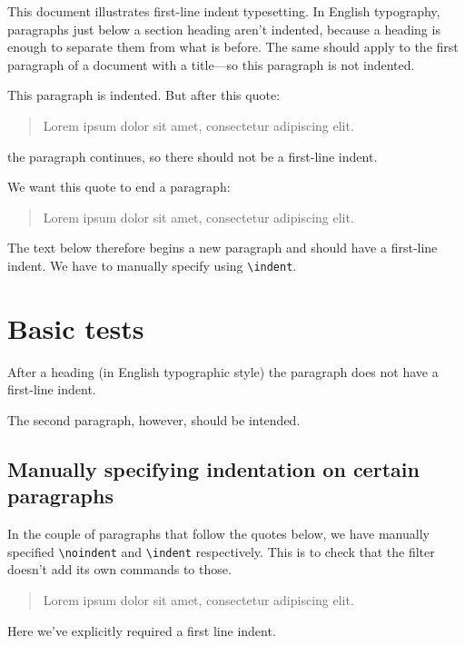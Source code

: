 \noindent This document illustrates first-line indent typesetting. In
English typography, paragraphs just below a section heading aren't
indented, because a heading is enough to separate them from what is
before. The same should apply to the first paragraph of a document with
a title---so this paragraph is not indented.

This paragraph is indented. But after this quote:

\begin{quote}
\noindent Lorem ipsum dolor sit amet, consectetur adipiscing elit.
\end{quote}

\noindent the paragraph continues, so there should not be a first-line
indent.

We want this quote to end a paragraph:

\begin{quote}
\noindent Lorem ipsum dolor sit amet, consectetur adipiscing elit.
\end{quote}

\indent The text below therefore begins a new paragraph and should have
a first-line indent. We have to manually specify using
\texttt{\textbackslash{}indent}.

\section{Basic tests}\label{basic-tests}

After a heading (in English typographic style) the paragraph does not
have a first-line indent.

The second paragraph, however, should be intended.

\subsection{Manually specifying indentation on certain
paragraphs}\label{manually-specifying-indentation-on-certain-paragraphs}

In the couple of paragraphs that follow the quotes below, we have
manually specified \texttt{\textbackslash{}noindent} and
\texttt{\textbackslash{}indent} respectively. This is to check that the
filter doesn't add its own commands to those.

\begin{quote}
\noindent Lorem ipsum dolor sit amet, consectetur adipiscing elit.
\end{quote}

\indent Here we've explicitly required a first line indent.

